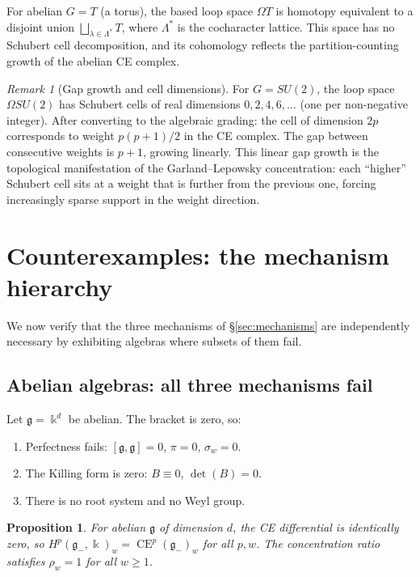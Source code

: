 \documentclass[11pt,reqno]{amsart}
\theoremstyle{plain}
\newtheorem{proposition}[theorem]{Proposition}
\theoremstyle{definition}
\theoremstyle{remark}
\newtheorem{remark}[theorem]{Remark}
\DeclareMathOperator{\CE}{CE}
\newcommand{\fg}{\mathfrak{g}}
\newcommand{\gminus}{\fg_{-}}
\newcommand{\kk}{\Bbbk}
\begin{document}
For abelian $G = T$ (a torus), the based loop space $\Omega T$ is
homotopy equivalent to a disjoint union $\bigsqcup_{\lambda \in
\Lambda^*} T$, where $\Lambda^*$ is the cocharacter lattice. This
space has no Schubert cell decomposition, and its cohomology reflects
the partition-counting growth of the abelian CE complex.

\begin{remark}[Gap growth and cell dimensions]\label{rem:gap-growth}
 For $G = SU(2)$, the loop space $\Omega SU(2)$ has Schubert cells of
 real dimensions $0, 2, 4, 6, \ldots$ (one per non-negative integer).
 After converting to the algebraic grading: the cell of dimension $2p$
 corresponds to weight $p(p+1)/2$ in the CE complex. The gap between
 consecutive weights is $p + 1$, growing linearly. This linear gap
 growth is the topological manifestation of the Garland--Lepowsky
 concentration: each ``higher'' Schubert cell sits at a weight that is
 further from the previous one, forcing increasingly sparse support
 in the weight direction.
\end{remark}


\section{Counterexamples: the mechanism hierarchy}
\label{sec:counterexamples}

We now verify that the three mechanisms of \S\ref{sec:mechanisms} are
independently necessary by exhibiting algebras where subsets of them fail.

\subsection{Abelian algebras: all three mechanisms fail}
\label{sec:abelian}

Let $\fg = \kk^d$ be abelian. The bracket is zero, so:
\begin{enumerate}[label=(\roman*)]
 \item Perfectness fails: $[\fg, \fg] = 0$, $\pi = 0$, $\sigma_w = 0$.
 \item The Killing form is zero: $B \equiv 0$, $\det(B) = 0$.
 \item There is no root system and no Weyl group.
\end{enumerate}

\begin{proposition}\label{prop:abelian-no-concentration}
 For abelian $\fg$ of dimension $d$, the CE differential is identically zero,
 so $H^p(\gminus, \kk)_w = \CE^p(\gminus)_w$ for all $p, w$. The
 concentration ratio satisfies $\rho_w = 1$ for all $w \ge 1$.
\end{proposition}
\end{document}
